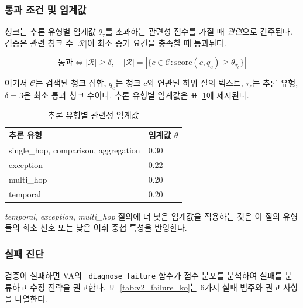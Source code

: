 \subsubsection*{통과 조건 및 임계값}

청크는 추론 유형별 임계값 $\theta_{\tau}$를 초과하는 관련성 점수를 가질 때 \emph{관련}으로 간주된다. 검증은 관련 청크 수 $|\mathcal{R}|$이 최소 증거 요건을 충족할 때 통과된다.

\begin{equation}
\text{통과} \iff |\mathcal{R}| \geq \delta, \quad
|\mathcal{R}| = |\{c \in \mathcal{C} : \text{score}(c, q_c) \geq \theta_{\tau_c}\}|
\label{eq:v2_pass_ko}
\end{equation}

여기서 $\mathcal{C}$는 검색된 청크 집합, $q_c$는 청크 $c$와 연관된 하위 질의 텍스트, $\tau_c$는 추론 유형, $\delta = 3$은 최소 통과 청크 수이다. 추론 유형별 임계값은 표~\ref{tab:v2_thresholds_ko}에 제시된다.

\begin{table}[H]
\centering
\caption{추론 유형별 관련성 임계값}
\label{tab:v2_thresholds_ko}
\begin{tabular}{ll}
\toprule
\textbf{추론 유형} & \textbf{임계값 $\theta$} \\
\midrule
single\_hop, comparison, aggregation & 0.30 \\
exception                            & 0.22 \\
multi\_hop                           & 0.20 \\
temporal                             & 0.20 \\
\bottomrule
\end{tabular}
\end{table}

\textit{temporal}, \textit{exception}, \textit{multi\_hop} 질의에 더 낮은 임계값을 적용하는 것은 이 질의 유형들의 희소 신호 또는 낮은 어휘 중첩 특성을 반영한다.

\subsubsection*{실패 진단}

검증이 실패하면 VA의 \texttt{\_diagnose\_failure} 함수가 점수 분포를 분석하여 실패를 분류하고 수정 전략을 권고한다. 표~\ref{tab:v2_failure_ko}는 6가지 실패 범주와 권고 사항을 나열한다.


